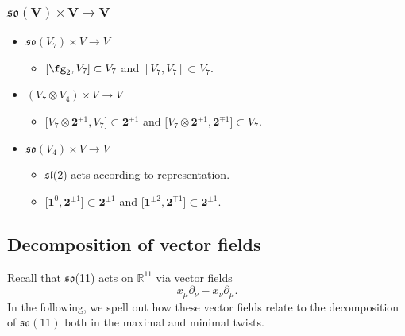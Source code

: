 \documentclass[10pt,a4paper]{amsart}
\numberwithin{equation}{section}
\theoremstyle{definition}
\def\R{\mathbb{R}}
\def\lie#1{\ensuremath{\mathfrak{#1}}}
\def\so{\lie{so}}
\begin{document}
\subsubsection[so(V) times V longrightarrow V]{$\boldsymbol{\lie{so}(V) \times V \longrightarrow V}$}
\begin{itemize}\itemsep=0pt
 \item[]\underline{$\lie{so}(V_7) \times V \longrightarrow V$}
 \begin{itemize}\itemsep=0pt
 \item[--] $[\fg_2, V_7] \subset V_7$ and $[V_7 , V_7] \subset V_7$.
 \end{itemize}
 \item[]\underline{$(V_7 \otimes V_4) \times V \longrightarrow V$}
 \begin{itemize}\itemsep=0pt
\item[--] $\big[V_7 \otimes \textbf{2}^{\pm 1} , V_7\big] \subset \textbf{2}^{\pm 1}$ and $\big[V_7 \otimes \textbf{2}^{\pm 1} , \textbf{2}^{\mp 1}\big] \subset V_7$.
 \end{itemize}
 \item[]\underline{$\lie{so}(V_4) \times V \longrightarrow V$}
\begin{itemize}\itemsep=0pt
\item[--] \lie{sl}(2) acts according to representation.
\item[--] $\big[\textbf{1}^0 , \textbf{2}^{\pm 1}\big] \subset \textbf{2}^{\pm 1}$ and $\big[\textbf{1}^{\pm 2} , \textbf{2}^{\mp 1}\big] \subset \textbf{2}^{\pm 1}$.
 \end{itemize}
\end{itemize}

\subsection{Decomposition of vector fields}
Recall that \lie{so}(11) acts on $\R^{11}$ via vector fields
\begin{equation}\label{eq: so-action}
 x_\mu \partial_\nu - x_\nu \partial_\mu .
\end{equation}
In the following, we spell out how these vector fields relate to the decomposition of $\so(11)$ both in the maximal and minimal twists.
\end{document}
